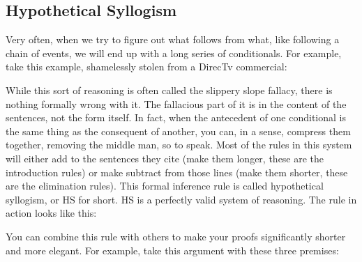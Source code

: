 \tissa

\subsection{Hypothetical Syllogism}

Very often, when we try to figure out what follows from what, like following a chain of events, we will end up with a long series of conditionals. For example, take this example, shamelessly stolen from a DirecTv commercial:\autocite{DirecTv}


While this sort of reasoning is often called the slippery slope fallacy, there is nothing formally wrong with it. The fallacious part of it is in the content of the sentences, not the form itself. In fact, when the antecedent of one conditional is the same thing as the consequent of another, you can, in a sense, compress them together, removing the middle man, so to speak. Most of the rules in this system will either add to the sentences they cite (make them longer, these are the introduction rules) or make subtract from those lines (make them shorter, these are the elimination rules). This formal inference rule is called hypothetical syllogism, or HS for short. HS is a perfectly valid system of reasoning. The rule in action looks like this:



You can combine this rule with others to make your proofs significantly shorter and more elegant. For example, take this argument with these three premises:
\begin{fitchproof}
\end{fitchproof}

